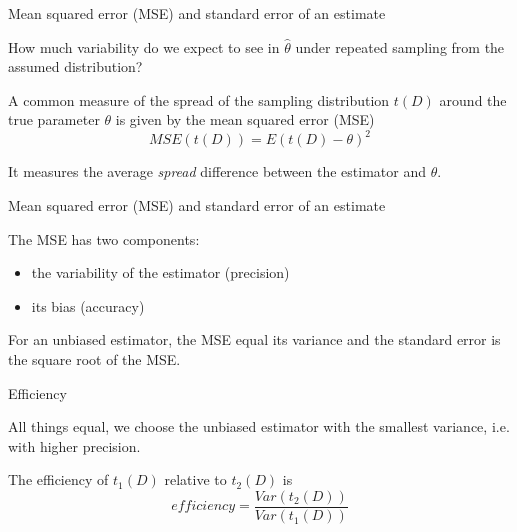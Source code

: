 \documentclass{beamer}
\begin{document}
\begin{frame}{Mean squared error (MSE) and standard error of an estimate}
	
	How much variability do we expect to see in $\hat{\theta}$ under repeated sampling from the 
	assumed distribution?

	\vskip 0.5cm

	\pause

	A common measure of the spread of the sampling distribution $t(D)$ around the true parameter $\theta$ is given by 
	the mean squared error (MSE)
	\begin{equation*}
		MSE(t(D)) = E{(t(D)-\theta)^2}
	\end{equation*}

	It measures the average \textit{spread} difference between the estimator and $\theta$.

\end{frame}

\begin{frame}{Mean squared error (MSE) and standard error of an estimate}

	The MSE has two components:
	\begin{itemize}
		\item the variability of the estimator (precision)
		\item its bias (accuracy)
	\end{itemize}

	\vskip 0.5cm

	For an unbiased estimator, the MSE equal its variance and the standard error is the square root of the MSE.

\end{frame}

\begin{frame}{Efficiency}

	All things equal, we choose the unbiased estimator with the smallest variance, i.e. with higher precision.

	\vskip 1cm

	The efficiency of $t_1(D)$ relative to $t_2(D)$ is
	\begin{equation*}
		efficiency = \frac{Var(t_2(D))}{Var(t_1(D))}
	\end{equation*}

\end{frame}
\end{document}
